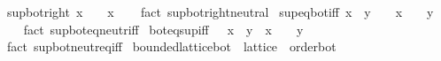 \begin{isabellebody}
\endisatagproof
{\isafoldproof}%
%
\isadelimproof
\isanewline
%
\endisadelimproof
\isanewline
{}\isamarkupfalse%
\ sup{\isacharunderscore}{\kern0pt}bot{\isacharunderscore}{\kern0pt}right{\isacharcolon}{\kern0pt}\ {\isachardoublequoteopen}x\ {\isasymsqunion}\ {\isasymbottom}\ {\isacharequal}{\kern0pt}\ x{\isachardoublequoteclose}\isanewline
%
\isadelimproof
\ \ %
\endisadelimproof
%
\isatagproof
{}\isamarkupfalse%
\ {\isacharparenleft}{\kern0pt}fact\ sup{\isacharunderscore}{\kern0pt}bot{\isachardot}{\kern0pt}right{\isacharunderscore}{\kern0pt}neutral{\isacharparenright}{\kern0pt}%
\endisatagproof
{\isafoldproof}%
%
\isadelimproof
\isanewline
%
\endisadelimproof
\isanewline
{}\isamarkupfalse%
\ sup{\isacharunderscore}{\kern0pt}eq{\isacharunderscore}{\kern0pt}bot{\isacharunderscore}{\kern0pt}iff{\isacharcolon}{\kern0pt}\ {\isachardoublequoteopen}x\ {\isasymsqunion}\ y\ {\isacharequal}{\kern0pt}\ {\isasymbottom}\ {\isasymlongleftrightarrow}\ x\ {\isacharequal}{\kern0pt}\ {\isasymbottom}\ {\isasymand}\ y\ {\isacharequal}{\kern0pt}\ {\isasymbottom}{\isachardoublequoteclose}\isanewline
%
\isadelimproof
\ \ %
\endisadelimproof
%
\isatagproof
{}\isamarkupfalse%
\ {\isacharparenleft}{\kern0pt}fact\ sup{\isacharunderscore}{\kern0pt}bot{\isachardot}{\kern0pt}eq{\isacharunderscore}{\kern0pt}neutr{\isacharunderscore}{\kern0pt}iff{\isacharparenright}{\kern0pt}%
\endisatagproof
{\isafoldproof}%
%
\isadelimproof
\isanewline
%
\endisadelimproof
\isanewline
{}\isamarkupfalse%
\ bot{\isacharunderscore}{\kern0pt}eq{\isacharunderscore}{\kern0pt}sup{\isacharunderscore}{\kern0pt}iff{\isacharcolon}{\kern0pt}\ {\isachardoublequoteopen}{\isasymbottom}\ {\isacharequal}{\kern0pt}\ x\ {\isasymsqunion}\ y\ {\isasymlongleftrightarrow}\ x\ {\isacharequal}{\kern0pt}\ {\isasymbottom}\ {\isasymand}\ y\ {\isacharequal}{\kern0pt}\ {\isasymbottom}{\isachardoublequoteclose}\isanewline
%
\isadelimproof
\ \ %
\endisadelimproof
%
\isatagproof
{}\isamarkupfalse%
\ {\isacharparenleft}{\kern0pt}fact\ sup{\isacharunderscore}{\kern0pt}bot{\isachardot}{\kern0pt}neutr{\isacharunderscore}{\kern0pt}eq{\isacharunderscore}{\kern0pt}iff{\isacharparenright}{\kern0pt}%
\endisatagproof
{\isafoldproof}%
%
\isadelimproof
\isanewline
%
\endisadelimproof
\isanewline
{}\isamarkupfalse%
\isanewline
\isanewline
{}\isamarkupfalse%
\ bounded{\isacharunderscore}{\kern0pt}lattice{\isacharunderscore}{\kern0pt}bot\ {\isacharequal}{\kern0pt}\ lattice\ {\isacharplus}{\kern0pt}\ order{\isacharunderscore}{\kern0pt}bot\isanewline

\end{isabellebody}
